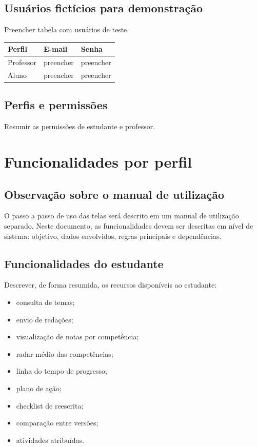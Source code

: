 \documentclass[12pt,a4paper]{article}
\begin{document}
\subsection{Usuários fictícios para demonstração}
Preencher tabela com usuários de teste.

\begin{longtable}{|p{4cm}|p{4cm}|p{4cm}|}
\hline
\textbf{Perfil} & \textbf{E-mail} & \textbf{Senha} \\
\hline
Professor & preencher & preencher \\
\hline
Aluno & preencher & preencher \\
\hline
\end{longtable}

\subsection{Perfis e permissões}
Resumir as permissões de estudante e professor.

\section{Funcionalidades por perfil}

\subsection{Observação sobre o manual de utilização}
O passo a passo de uso das telas será descrito em um manual de utilização separado.
Neste documento, as funcionalidades devem ser descritas em nível de sistema: objetivo, dados envolvidos, regras principais e dependências.

\subsection{Funcionalidades do estudante}
Descrever, de forma resumida, os recursos disponíveis ao estudante:
\begin{itemize}
    \item consulta de temas;
    \item envio de redações;
    \item visualização de notas por competência;
    \item radar médio das competências;
    \item linha do tempo de progresso;
    \item plano de ação;
    \item checklist de reescrita;
    \item comparação entre versões;
    \item atividades atribuídas.
\end{itemize}
\end{document}
